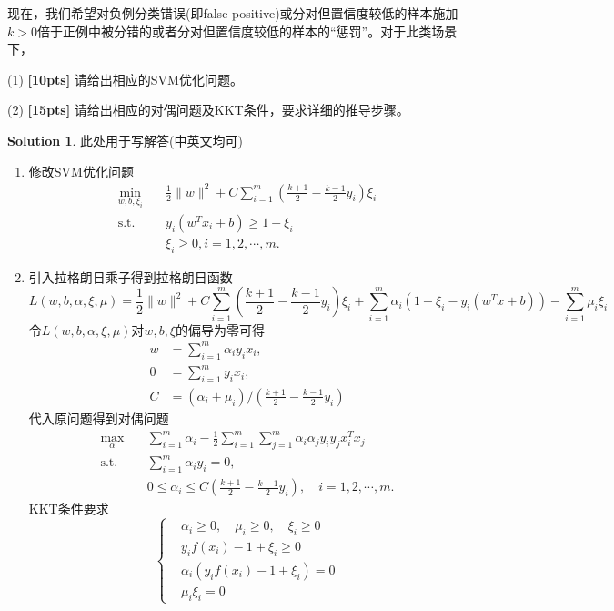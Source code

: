 \documentclass[a4paper,UTF8]{article}
\theoremstyle{definition}
\newtheorem*{solution}{Solution}
\begin{document}
现在，我们希望对负例分类错误(即false positive)或分对但置信度较低的样本施加$k>0$倍于正例中被分错的或者分对但置信度较低的样本的“惩罚”。对于此类场景下，

(1) \textbf{[10pts]} 请给出相应的SVM优化问题。

(2) \textbf{[15pts]} 请给出相应的对偶问题及KKT条件，要求详细的推导步骤。

\begin{solution}此处用于写解答(中英文均可)
	\begin{enumerate}[(1)]
		\item 
		修改SVM优化问题
		\begin{align*}
		\min_{w,b,\xi_i}&\quad\frac{1}{2}\lVert w\rVert^2+C\sum_{i=1}^m(\frac{k+1}2-\frac{k-1}2y_i)\xi_i\\
		\text{s.t.}&\quad y_i(w^Tx_i + b)\geq 1-\xi_i\\
		&\quad\xi_i\geq 0,i=1,2,\cdots,m.
		\end{align*}
		\item 
		引入拉格朗日乘子得到拉格朗日函数
		\[
		L(w,b,\alpha,\xi,\mu)=\frac{1}{2}\lVert w\rVert^2+C\sum_{i=1}^m(\frac{k+1}2-\frac{k-1}2y_i)\xi_i+\sum_{i=1}^m\alpha_i(1-\xi_i-y_i(w^Tx+b))-\sum_{i=1}^m\mu_i\xi_i
		\]
		令$L(w,b,\alpha,\xi,\mu)$对$w,b,\xi$的偏导为零可得
		\begin{align*}
		w&=\sum_{i=1}^m\alpha_iy_ix_i,\\
		0&=\sum_{i=1}^m y_ix_i,\\
		C&=(\alpha_i+\mu_i)/(\frac{k+1}2-\frac{k-1}2y_i)
		\end{align*}
		代入原问题得到对偶问题
		\begin{align*}
		\max_\alpha&\quad\sum_{i=1}^m\alpha_i-\frac12\sum_{i=1}^m\sum_{j=1}^m\alpha_i\alpha_j y_i y_j x_i^T x_j\\
		\text{s.t.}&\quad \sum_{i=1}^m \alpha_iy_i=0,\\
		&\quad 0\leq\alpha_i\leq C(\frac{k+1}2-\frac{k-1}2y_i),\quad i=1,2,\cdots,m.
		\end{align*}
		KKT条件要求
		\[
		\left\{
		\begin{aligned}
		&\alpha_i\geq0,\quad\mu_i\geq0,\quad\xi_i\geq0\\
		&y_if(x_i)-1+\xi_i\geq0\\
		&\alpha_i(y_if(x_i)-1+\xi_i)=0\\
		&\mu_i\xi_i=0
		\end{aligned}
		\right.
		\]
	\end{enumerate}
\end{solution}
\end{document}
